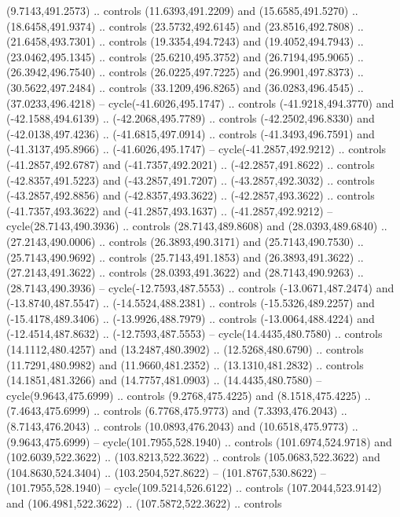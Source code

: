 \begin{scope}[shift={(58.28571,-442.36218)}]
    (9.7143,491.2573) .. controls (11.6393,491.2209) and (15.6585,491.5270) ..
    (18.6458,491.9374) .. controls (23.5732,492.6145) and (23.8516,492.7808) ..
    (21.6458,493.7301) .. controls (19.3354,494.7243) and (19.4052,494.7943) ..
    (23.0462,495.1345) .. controls (25.6210,495.3752) and (26.7194,495.9065) ..
    (26.3942,496.7540) .. controls (26.0225,497.7225) and (26.9901,497.8373) ..
    (30.5622,497.2484) .. controls (33.1209,496.8265) and (36.0283,496.4545) ..
    (37.0233,496.4218) -- cycle(-41.6026,495.1747) .. controls (-41.9218,494.3770)
    and (-42.1588,494.6139) .. (-42.2068,495.7789) .. controls (-42.2502,496.8330)
    and (-42.0138,497.4236) .. (-41.6815,497.0914) .. controls (-41.3493,496.7591)
    and (-41.3137,495.8966) .. (-41.6026,495.1747) -- cycle(-41.2857,492.9212) ..
    controls (-41.2857,492.6787) and (-41.7357,492.2021) .. (-42.2857,491.8622) ..
    controls (-42.8357,491.5223) and (-43.2857,491.7207) .. (-43.2857,492.3032) ..
    controls (-43.2857,492.8856) and (-42.8357,493.3622) .. (-42.2857,493.3622) ..
    controls (-41.7357,493.3622) and (-41.2857,493.1637) .. (-41.2857,492.9212) --
    cycle(28.7143,490.3936) .. controls (28.7143,489.8608) and (28.0393,489.6840)
    .. (27.2143,490.0006) .. controls (26.3893,490.3171) and (25.7143,490.7530) ..
    (25.7143,490.9692) .. controls (25.7143,491.1853) and (26.3893,491.3622) ..
    (27.2143,491.3622) .. controls (28.0393,491.3622) and (28.7143,490.9263) ..
    (28.7143,490.3936) -- cycle(-12.7593,487.5553) .. controls (-13.0671,487.2474)
    and (-13.8740,487.5547) .. (-14.5524,488.2381) .. controls (-15.5326,489.2257)
    and (-15.4178,489.3406) .. (-13.9926,488.7979) .. controls (-13.0064,488.4224)
    and (-12.4514,487.8632) .. (-12.7593,487.5553) -- cycle(14.4435,480.7580) ..
    controls (14.1112,480.4257) and (13.2487,480.3902) .. (12.5268,480.6790) ..
    controls (11.7291,480.9982) and (11.9660,481.2352) .. (13.1310,481.2832) ..
    controls (14.1851,481.3266) and (14.7757,481.0903) .. (14.4435,480.7580) --
    cycle(9.9643,475.6999) .. controls (9.2768,475.4225) and (8.1518,475.4225) ..
    (7.4643,475.6999) .. controls (6.7768,475.9773) and (7.3393,476.2043) ..
    (8.7143,476.2043) .. controls (10.0893,476.2043) and (10.6518,475.9773) ..
    (9.9643,475.6999) -- cycle(101.7955,528.1940) .. controls (101.6974,524.9718)
    and (102.6039,522.3622) .. (103.8213,522.3622) .. controls (105.0683,522.3622)
    and (104.8630,524.3404) .. (103.2504,527.8622) -- (101.8767,530.8622) --
    (101.7955,528.1940) -- cycle(109.5214,526.6122) .. controls
    (107.2044,523.9142) and (106.4981,522.3622) .. (107.5872,522.3622) .. controls

\end{scope}
